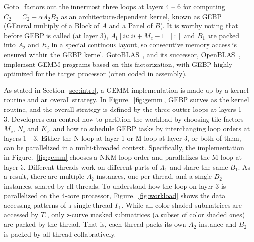 Goto~\cite{gotogemm} factors out the innermost three loops at layers 4 -- 6 for
computing $C_2\ = C_2 + \alpha A_2 B_2$ as an architecture-dependent kernel,
known as  GEBP (GEneral multiply of a Block of $A$ and a Panel of $B$).
It is worthy noting that before GEBP is called (at layer 3),
$A_1[ii:ii+M_c-1][:]$ and $B_1$ are packed into $A_2$ and $B_2$
in a special continous layout,
so consecutive memory access is ensured within the GEBP kernel.
GotoBLAS~\cite{gotoblas}, and its successor, OpenBLAS~\cite{openblas},
implement GEMM programs based on this factorization,
with GEBP highly optimized for the target processor (often coded in assembly).

As stated in Section~\ref{sec:intro}, a GEMM implementation
is made up by a kernel routine and an overall strategy.
In Figure.~\ref{fig:gemm}, GEBP surves as the kernel routine,
and the overall strategy is defined by the three outter loops at layers 1 -- 3.
Developers can control how to partition the workload by choosing
tile factors $M_c$, $N_c$ and $K_c$,
and how to schedule GEBP tasks by interchanging loop orders at layers 1 - 3.
Either the N loop at layer 1 or M loop at layer 3, or both of them,
can be parallelized in a multi-threaded context.
Specifically, the implementation in Figure.~\ref{fig:gemm}
chooses a NKM loop order and parallelizes the M loop at layer 3.
Different threads work on different parts of $A_1$
and share the same $B_1$.
As a result, there are multiple $A_2$ instances, one per thread,
and a single $B_2$ instances, shared by all threads.
To understand how the loop on layer 3 is parallelized on the 4-core processor, 
Figure.~\ref{fig:workload} shows the data accessing patterns of a single thread $T_1$.
While all color shaded submatrices are accessed by $T_1$,
only z-curve masked submatrices (a subset of color shaded ones)
are packed by the thread.
That is, each thread packs its own $A_2$ instance and 
$B_2$ is packed by all thread collabratively.

